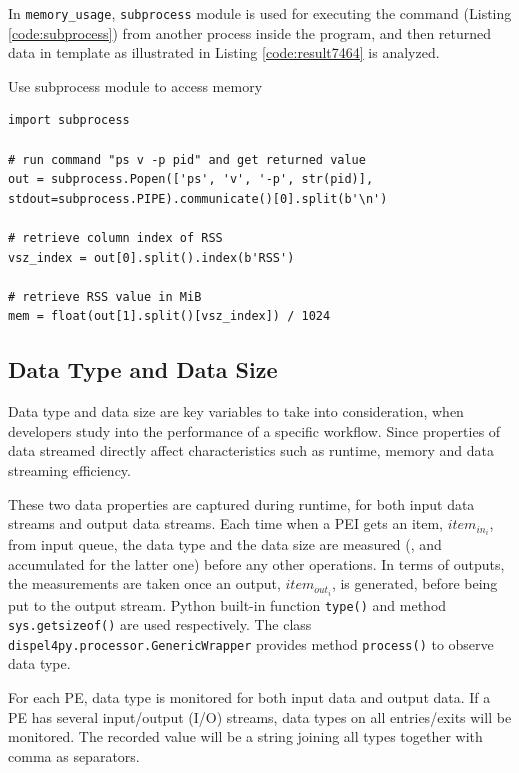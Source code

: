 \documentclass[10pt,twoside,openright,logo]{report}
\begin{document}
In \texttt{memory_usage}, \texttt{subprocess} module is used for executing the command (Listing \ref{code:subprocess}) from another process inside the program, and then returned data in template as illustrated in Listing \ref{code:result7464} is analyzed.
\begin{listing}
\caption{Use subprocess module to access memory}
\label{code:subprocess}
\begin{verbatim}
import subprocess

# run command "ps v -p pid" and get returned value
out = subprocess.Popen(['ps', 'v', '-p', str(pid)], stdout=subprocess.PIPE).communicate()[0].split(b'\n')

# retrieve column index of RSS
vsz_index = out[0].split().index(b'RSS')

# retrieve RSS value in MiB
mem = float(out[1].split()[vsz_index]) / 1024
\end{verbatim}
\end{listing}

\subsection{Data Type and Data Size}
Data type and data size are key variables to take into consideration, when developers study into the performance of a specific workflow. Since properties of data streamed directly affect characteristics such as runtime, memory and data streaming efficiency.

These two data properties are captured during runtime, for both input data streams and output data streams. Each time when a PEI gets an item, $item_{in_i}$, from input queue, the data type and the data size are measured (, and accumulated for the latter one) before any other operations. In terms of outputs, the measurements are taken once an output, $item_{out_i}$, is generated, before being put to the output stream. Python built-in function \texttt{type()} and method \texttt{sys.getsizeof()} are used respectively. The class \texttt{dispel4py.processor.GenericWrapper} provides method \texttt{process()} to observe data type.

For each PE, data type is monitored for both input data and output data. If a PE has several input/output (I/O) streams, data types on all entries/exits will be monitored. The recorded value will be a string joining all types together with comma as separators.
\end{document}

